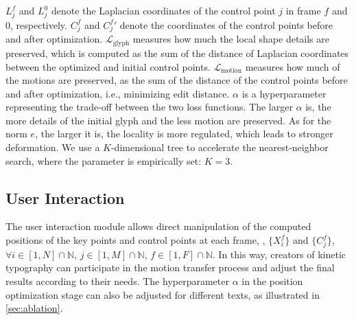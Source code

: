 $L_{j}^f$ and $L_{j}^0$ denote the Laplacian coordinates of the control point $j$ in frame $f$ and $0$, respectively. $C_j^f$ and $C_j^f\prime$ denote the coordinates of the control points before and after optimization.
$\mathcal{L}_{\text{glyph}}$ measures how much the local shape details are preserved, which is computed as the sum of the distance of Laplacian coordinates between the optimized and initial control points. 
$\mathcal{L}_{\text{motion}}$ measures how much of the motions are preserved, as the sum of the distance of the control points before and after optimization, i.e., minimizing edit distance.
$\alpha$ is a hyperparameter representing the trade-off between the two loss functions.
The larger $\alpha$ is, the more details of the initial glyph and the less motion are preserved.
As for the norm $e$, the larger it is, the locality is more regulated, which leads to stronger deformation.
We use a $K$-dimensional tree to accelerate the nearest-neighbor search, where the parameter is empirically set: $K=3$.

\subsection{User Interaction}
The user interaction module allows direct manipulation of the computed positions of the key points and control points at each frame, \ie, $\{X_i^f\}$ and $\{C_j^f\}$, $\forall i \in [1, N]\cap \mathbb{N}$, $j\in [1,M]\cap\mathbb{N}$, $f\in [1, F]\cap\mathbb{N}$.
In this way, creators of kinetic typography can participate in the motion transfer process and adjust the final results according to their needs.
The hyperparameter $\alpha$ in the position optimization stage can also be adjusted for different texts, as illustrated in \autoref{sec:ablation}.

